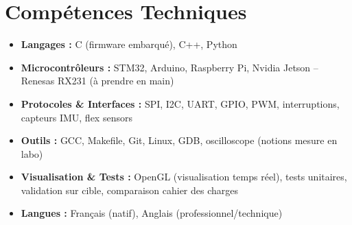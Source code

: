 \documentclass[a4paper,11pt]{article}
\begin{document}
\section{Compétences Techniques}
\begin{itemize}[leftmargin=*, nosep]
    \item \small{\textbf{Langages :} C (firmware embarqué), C++, Python}
    \item \small{\textbf{Microcontrôleurs :} STM32, Arduino, Raspberry Pi, Nvidia Jetson -- Renesas RX231 (à prendre en main)}
    \item \small{\textbf{Protocoles \& Interfaces :} SPI, I2C, UART, GPIO, PWM, interruptions, capteurs IMU, flex sensors}
    \item \small{\textbf{Outils :} GCC, Makefile, Git, Linux, GDB, oscilloscope (notions mesure en labo)}
    \item \small{\textbf{Visualisation \& Tests :} OpenGL (visualisation temps réel), tests unitaires, validation sur cible, comparaison cahier des charges}
    \item \small{\textbf{Langues :} Français (natif), Anglais (professionnel/technique)}
\end{itemize}

\end{document}
